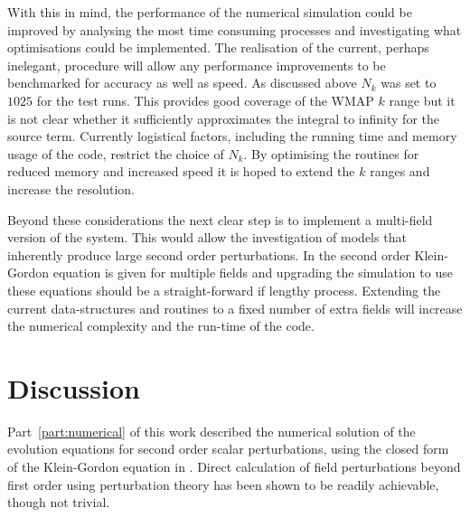 With this in mind, the performance of the numerical simulation could be improved by
analysing the most time consuming processes and investigating what
optimisations could be implemented. The realisation of the current, perhaps
inelegant, procedure will allow any performance improvements to be benchmarked for
accuracy as well as speed.
% 
As discussed above $N_k$ was set to $1025$ for the test runs. This provides good
coverage of the
WMAP $k$ range but it is not clear whether it sufficiently
approximates the integral to infinity for the source term.  Currently
logistical factors, including the running time and memory usage of the code,
restrict the choice of $N_k$. By optimising the routines
for reduced memory and increased speed it is hoped to extend the $k$ ranges and
increase the resolution. 


Beyond these considerations the next clear step is to implement a multi-field
version of the system. This would allow the investigation of models that inherently
produce large second order perturbations. In  the
second order Klein-Gordon equation is given for multiple fields and upgrading the
simulation to use these equations should be a straight-forward if lengthy process.
Extending the current data-structures and routines to a fixed number of extra fields
will increase the numerical complexity and the run-time of the code. 



% 
% 
% 
\section{Discussion}
\label{sec:disc-num}

Part~\ref{part:numerical} of this work described the numerical
solution of the evolution equations for second order scalar perturbations, using the
closed form of the Klein-Gordon equation in . Direct
calculation of field perturbations beyond
first order using perturbation theory has been shown to be readily achievable, though
not trivial.

